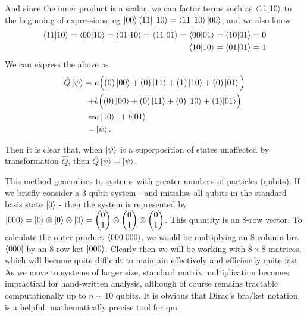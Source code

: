 \begin{example}
    And since the inner product is a scalar, we can factor terms such as $\braket{11|10}$ to the beginning of expressions, eg $ \ket{00} \bra{11} \ket{10} = \langle 11\ket{10} \ket{00}$, and we also know
    \begin{equation}
        \begin{split}
        \braket{11|10} = \braket{00|10} =  \braket{01|10} = \braket{11|01} = \braket{00|01}  = \braket{10|01} = 0 
        \\ \braket{10|10} = \braket{01|01} = 1 
        \end{split}
    \end{equation}
    We can express the above as 
    \begin{equation}
        \begin{split}
            \hat{Q}\ket{\psi} = 
            \ &a \Big((0) \ket{00}  + (0) \ket{11} + (1) \ket{10}  + (0) \ket{01} \Big)
            \\ + &b \Big((0)\ket{00} +(0) \ket{11}+ (0) \ket{10} + (1) |01 \rangle \Big)
            \\ = &a\ket{10}| + b |01 \rangle 
            \\ = &\ket{\psi}.
        \end{split}
    \end{equation}
    
    Then it is clear that, when $\ket{\psi}$ is a superposition of states unaffected by transformation $\hat{Q}$, then $\hat{Q}\ket{\psi} = \ket{\psi} $. 
\end{example}
\par 

This method generalises to systems with greater numbers of particles (qubits). 
If we briefly consider a 3 qubit system - and initialise all qubits in the standard basis state $\ket{0}$ 
- then the system is represented by $|000\rangle = \ket{0} \otimes \ket{0} \otimes \ket{0} = \left(\begin{matrix}0\\1\end{matrix}\right) \otimes \left(\begin{matrix}0\\1\end{matrix}\right) \otimes \left(\begin{matrix}0\\1\end{matrix}\right)$. 
This quantity is an 8-row vector.  To calculate the outer product $\langle 000 | 000 \rangle$, we would be multiplying an 8-column bra $\langle000| $ by an 8-row ket $|000\rangle$. 
Clearly then we will be working with $8 \times 8$ matrices, which will become quite difficult to maintain effectively and efficiently quite fast. 
As we move to systems of larger size, standard matrix multiplication becomes impractical for hand-written analysis, 
    although of course remains tractable computationally up to $n\sim 10$ qubits. 
It is obvious that Dirac's bra/ket notation is a helpful, mathematically precise tool for \gls{qm}. 
